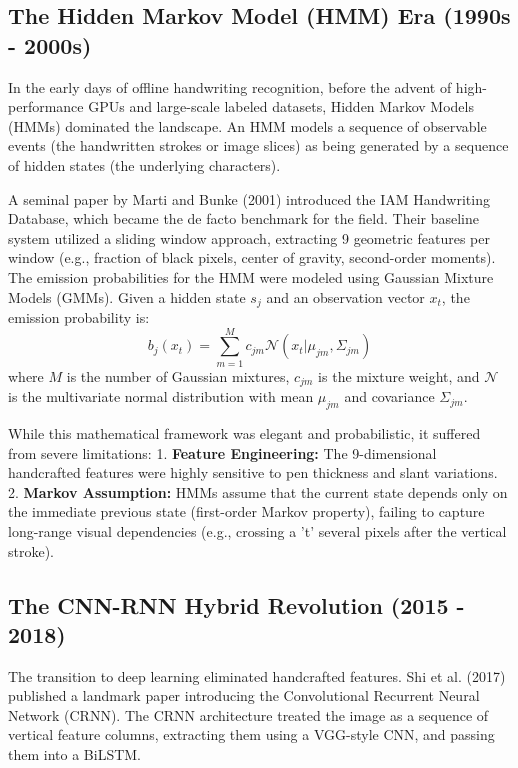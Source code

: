 \subsection{The Hidden Markov Model (HMM) Era (1990s - 2000s)}
In the early days of offline handwriting recognition, before the advent of high-performance GPUs and large-scale labeled datasets, Hidden Markov Models (HMMs) dominated the landscape. An HMM models a sequence of observable events (the handwritten strokes or image slices) as being generated by a sequence of hidden states (the underlying characters).

A seminal paper by Marti and Bunke (2001) introduced the IAM Handwriting Database, which became the de facto benchmark for the field. Their baseline system utilized a sliding window approach, extracting 9 geometric features per window (e.g., fraction of black pixels, center of gravity, second-order moments). The emission probabilities for the HMM were modeled using Gaussian Mixture Models (GMMs). Given a hidden state $s_j$ and an observation vector $x_t$, the emission probability is:
\begin{equation}
    b_j(x_t) = \sum_{m=1}^M c_{jm} \mathcal{N}(x_t | \mu_{jm}, \Sigma_{jm})
\end{equation}
where $M$ is the number of Gaussian mixtures, $c_{jm}$ is the mixture weight, and $\mathcal{N}$ is the multivariate normal distribution with mean $\mu_{jm}$ and covariance $\Sigma_{jm}$.

While this mathematical framework was elegant and probabilistic, it suffered from severe limitations:
1. \textbf{Feature Engineering:} The 9-dimensional handcrafted features were highly sensitive to pen thickness and slant variations.
2. \textbf{Markov Assumption:} HMMs assume that the current state depends only on the immediate previous state (first-order Markov property), failing to capture long-range visual dependencies (e.g., crossing a 't' several pixels after the vertical stroke).

\subsection{The CNN-RNN Hybrid Revolution (2015 - 2018)}
The transition to deep learning eliminated handcrafted features. Shi et al. (2017) published a landmark paper introducing the Convolutional Recurrent Neural Network (CRNN). The CRNN architecture treated the image as a sequence of vertical feature columns, extracting them using a VGG-style CNN, and passing them into a BiLSTM.

